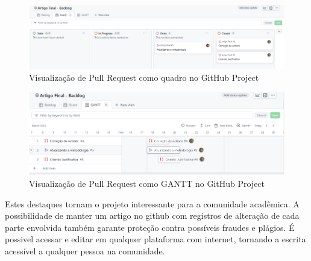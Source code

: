 \begin{figure}[ht]
	\centering
	\includegraphics[width=.8\textwidth]{./images/fig08.png}
	\caption{Visualização de Pull Request como quadro no GitHub Project}
	\label{fig:fig08}
\end{figure}

\begin{figure}[ht]
	\centering
	\includegraphics[width=.8\textwidth]{./images/fig09.png}
	\caption{Visualização de Pull Request como GANTT no GitHub Project}
	\label{fig:fig09}
\end{figure}

Estes destaques tornam o projeto interessante para a comunidade acadêmica. A possibilidade de manter um artigo no github com registros de alteração de cada parte envolvida também garante proteção contra possíveis fraudes e plágios. É possivel acessar e editar em qualquer plataforma com internet, tornando a escrita acessível a qualquer pessoa na comunidade.

